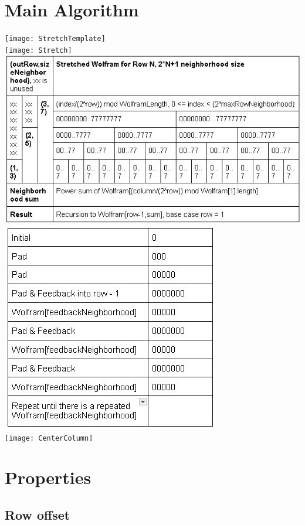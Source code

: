 \documentclass[11pt]{article}
\begin{document}
    \section{Main Algorithm}
    \begin{center}
        \texttt{[image: StretchTemplate]}\\
    \texttt{[image: Stretch]}\\
    \includegraphics{RuleStretch}\\
    \includegraphics{StretchFeedback}\\
    \texttt{[image: CenterColumn]}\\

        \end{center}
	\section{Properties}

    \subsection{Row offset}
\end{document}

